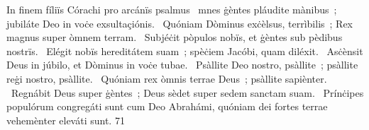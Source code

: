 { In finem fíliïs Córachi pro arcánïs psalmus}
{%
~mnes ġèntes pláudite mànibus~; jubiláte Deo in voċe exsultaçiónis. 
~Quóniam Dòminus exċèlsus, terrìbilis~; Rex magnus super òmnem terram. 
~Subjéċit pòpulos nobïs, et ġèntes sub pèdibus nostrïs. 
~Elégit nobïs hereditátem suam~; spèċiem Jacóbi, quam diléxit. 
~Asċènsit Deus in júbilo, et Dòminus in voċe tubae. 
~Psàllite Deo nostro, psàllite~; psàllite reġi nostro, psàllite. 
~Quóniam rex òmnis terrae Deus~; psàllite sapiènter. 
~Regnábit Deus super ġèntes~; Deus sèdet super sedem sanctam suam. 
~Prínċipes populórum congregáti sunt cum Deo Abrahámi, quóniam dei fortes terrae vehemènter eleváti sunt. 
}
{7}{1}
